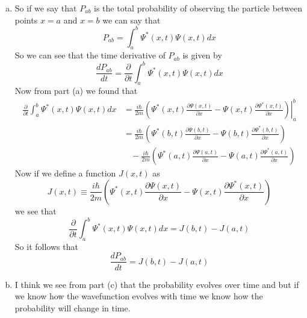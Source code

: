 \documentclass[11pt]{article}
\numberwithin{equation}{section}
\begin{document}
\begin{enumerate}[(a)]
\item
So if we say that $P_{ab}$ is the total probability of observing the particle between points $x=a$ and $x=b$ we can say that
$$P_{ab} =  \int_{a}^{b}\Psi^*(x,t)\Psi(x,t)dx$$
So we can see that the time derivative of $P_{ab}$ is given by
$$\frac{dP_{ab}}{dt} =  \frac{\partial}{\partial t}\int_{a}^{b}\Psi^*(x,t)\Psi(x,t)dx$$
Now from part (a) we found that
\begin{align*}
\frac{\partial}{\partial t}\int_{a}^{b}\Psi^*(x,t)\Psi(x,t)dx &= \left.\frac{i\hbar}{2m}\left(\Psi^*(x,t)\frac{\partial\Psi(x,t)}{\partial x} - \Psi(x,t)\frac{\partial\Psi^*(x,t)}{\partial x}\right)\right|_{a}^{b}\\
&= \frac{i\hbar}{2m}\left(\Psi^*(b,t)\frac{\partial\Psi(b,t)}{\partial x} - \Psi(b,t)\frac{\partial\Psi^*(b,t)}{\partial x}\right) \\
& \ \ \ \  - \frac{i\hbar}{2m}\left(\Psi^*(a,t)\frac{\partial\Psi(a,t)}{\partial x} - \Psi(a,t)\frac{\partial\Psi^*(a,t)}{\partial x}\right)
\end{align*}
Now if we define a function $J(x,t)$ as
$$J(x,t) \equiv \frac{i\hbar}{2m}\left(\Psi^*(x,t)\frac{\partial\Psi(x,t)}{\partial x} - \Psi(x,t)\frac{\partial\Psi^*(x,t)}{\partial x}\right)$$
we see that
$$\frac{\partial}{\partial t}\int_{a}^{b}\Psi^*(x,t)\Psi(x,t)dx = J(b,t) - J(a,t)$$ 
So it follows that 
$$\frac{dP_{ab}}{dt} = J(b,t) - J(a,t)$$

\item
I think we see from part (c) that the probability evolves over time and but if we know how the wavefunction evolves with time we know how the probability will change in time.
\end{enumerate}
\end{document}
